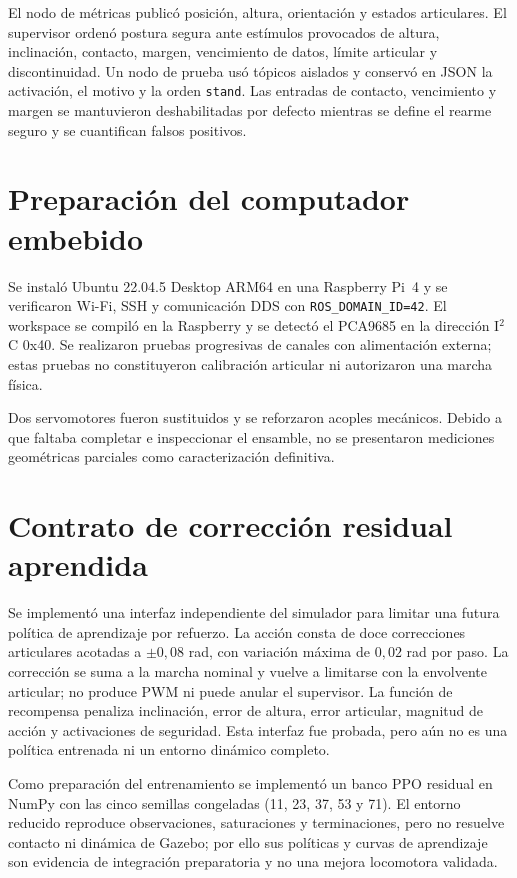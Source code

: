 El nodo de métricas publicó posición, altura, orientación y estados articulares.
El supervisor ordenó postura segura ante estímulos provocados de altura,
inclinación, contacto, margen, vencimiento de datos, límite articular y
discontinuidad. Un nodo de prueba usó tópicos aislados y conservó en JSON la
activación, el motivo y la orden \texttt{stand}. Las entradas de contacto,
vencimiento y margen se mantuvieron deshabilitadas por defecto mientras se
define el rearme seguro y se cuantifican falsos positivos.

\section{Preparación del computador embebido}

Se instaló Ubuntu 22.04.5 Desktop ARM64 en una Raspberry Pi~4 y se verificaron
Wi-Fi, SSH y comunicación DDS con \texttt{ROS\_DOMAIN\_ID=42}. El workspace se
compiló en la Raspberry y se detectó el PCA9685 en la dirección I$^2$C 0x40. Se
realizaron pruebas progresivas de canales con alimentación externa; estas
pruebas no constituyeron calibración articular ni autorizaron una marcha
física.

Dos servomotores fueron sustituidos y se reforzaron acoples mecánicos. Debido a
que faltaba completar e inspeccionar el ensamble, no se presentaron mediciones
geométricas parciales como caracterización definitiva.

\section{Contrato de corrección residual aprendida}

Se implementó una interfaz independiente del simulador para limitar una futura
política de aprendizaje por refuerzo. La acción consta de doce correcciones
articulares acotadas a $\pm0{,}08$ rad, con variación máxima de $0{,}02$ rad por
paso. La corrección se suma a la marcha nominal y vuelve a limitarse con la
envolvente articular; no produce PWM ni puede anular el supervisor. La función
de recompensa penaliza inclinación, error de altura, error articular, magnitud
de acción y activaciones de seguridad. Esta interfaz fue probada, pero aún no
es una política entrenada ni un entorno dinámico completo.

Como preparación del entrenamiento se implementó un banco PPO residual en
NumPy con las cinco semillas congeladas (11, 23, 37, 53 y 71). El entorno
reducido reproduce observaciones, saturaciones y terminaciones, pero no resuelve
contacto ni dinámica de Gazebo; por ello sus políticas y curvas de aprendizaje
son evidencia de integración preparatoria y no una mejora locomotora validada.
